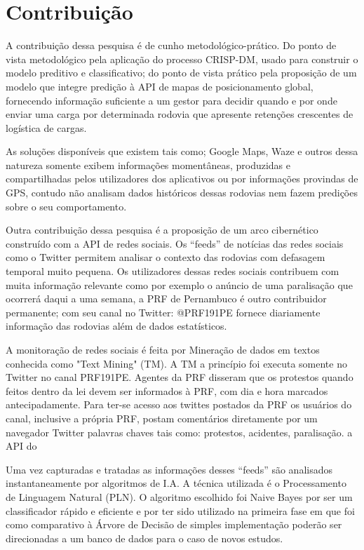 \chapter{Contribuição}\label{meto}

A contribuição dessa pesquisa é de cunho metodológico-prático.
Do ponto de vista metodológico pela aplicação do processo CRISP-DM, usado para construir o modelo preditivo e classificativo; do ponto de vista prático pela proposição de um modelo que integre predição à API de mapas de posicionamento global, fornecendo informação suficiente a um gestor para decidir quando e por onde enviar uma carga por determinada rodovia que apresente retenções crescentes de logística de cargas. 

As soluções disponíveis que existem tais como; Google Maps, Waze e outros dessa natureza somente exibem informações momentâneas, produzidas e compartilhadas pelos utilizadores dos aplicativos ou por informações provindas de GPS, contudo não analisam dados históricos dessas rodovias nem fazem predições sobre o seu comportamento.

Outra contribuição dessa pesquisa é a proposição de um arco cibernético construído com a API de redes sociais.
Os ``feeds'' de notícias das redes sociais como o Twitter permitem analisar o contexto das rodovias com defasagem temporal muito pequena.
Os utilizadores dessas redes sociais contribuem com muita informação relevante como por exemplo o anúncio de uma paralisação que ocorrerá 
daqui a uma semana, a PRF de Pernambuco é outro contribuidor permanente; com seu canal no Twitter: @PRF191PE fornece diariamente informação das rodovias 
além de dados estatísticos. 

A monitoração de redes sociais é feita por Mineração de dados em textos conhecida como "Text Mining" (TM).
A TM a princípio foi executa somente no Twitter no canal PRF191PE. Agentes da PRF disseram que os protestos quando feitos dentro da lei
devem ser informados à PRF, com dia e hora marcados antecipadamente.
Para ter-se acesso aos twittes postados da PRF os usuários do canal, inclusive a própria PRF, postam comentários diretamente 
por um navegador Twitter palavras chaves tais como: protestos, acidentes, paralisação.  a API do 

Uma vez capturadas e tratadas as informações desses ``feeds'' são analisados instantaneamente por algoritmos de I.A. 
A técnica utilizada é o Processamento de Linguagem Natural (PLN). O algoritmo escolhido foi Naive Bayes por ser um classificador 
rápido e eficiente e por ter sido utilizado na primeira fase em que foi como comparativo à Árvore de Decisão de simples implementação 
poderão ser direcionadas a um banco de dados para o caso de novos estudos.



